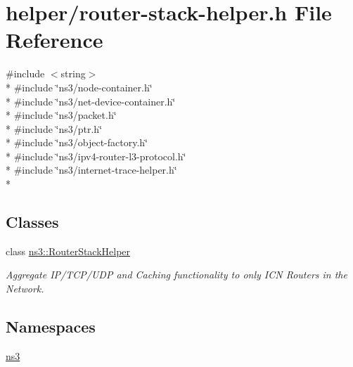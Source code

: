 \hypertarget{router-stack-helper_8h}{\section{helper/router-\/stack-\/helper.h File Reference}
\label{router-stack-helper_8h}
}
{\ttfamily \#include $<$string$>$}\\*
{\ttfamily \#include \char`\"{}ns3/node-\/container.\-h\char`\"{}}\\*
{\ttfamily \#include \char`\"{}ns3/net-\/device-\/container.\-h\char`\"{}}\\*
{\ttfamily \#include \char`\"{}ns3/packet.\-h\char`\"{}}\\*
{\ttfamily \#include \char`\"{}ns3/ptr.\-h\char`\"{}}\\*
{\ttfamily \#include \char`\"{}ns3/object-\/factory.\-h\char`\"{}}\\*
{\ttfamily \#include \char`\"{}ns3/ipv4-\/router-\/l3-\/protocol.\-h\char`\"{}}\\*
{\ttfamily \#include \char`\"{}ns3/internet-\/trace-\/helper.\-h\char`\"{}}\\*
\subsection*{Classes}
\begin{DoxyCompactItemize}
\item 
class \hyperlink{classns3_1_1RouterStackHelper}{ns3\-::\-Router\-Stack\-Helper}
\begin{DoxyCompactList}\small\item\em Aggregate I\-P/\-T\-C\-P/\-U\-D\-P and Caching functionality to only I\-C\-N Routers in the Network. \end{DoxyCompactList}\end{DoxyCompactItemize}
\subsection*{Namespaces}
\begin{DoxyCompactItemize}
\item 
\hyperlink{namespacens3}{ns3}
\end{DoxyCompactItemize}

